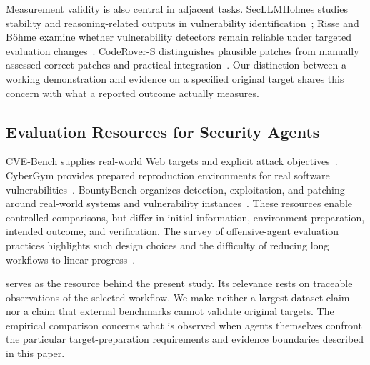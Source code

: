 Measurement validity is also central in adjacent tasks. SecLLMHolmes
studies stability and reasoning-related outputs in vulnerability
identification~\cite{ullah2024secllmholmes}; Risse and B\"ohme examine
whether vulnerability detectors remain reliable under targeted
evaluation changes~\cite{risse2024limits}. CodeRover-S distinguishes
plausible patches from manually assessed correct patches and practical
integration~\cite{zhang2026ossfuzzrepair}. Our distinction between a
working demonstration and evidence on a specified original target shares
this concern with what a reported outcome actually measures.

\subsection{Evaluation Resources for Security Agents}

CVE-Bench supplies real-world Web targets and explicit attack
objectives~\cite{cvebench}. CyberGym provides prepared reproduction
environments for real software vulnerabilities~\cite{cybergym}.
BountyBench organizes detection, exploitation, and patching around
real-world systems and vulnerability instances~\cite{bountybench}.
These resources enable controlled comparisons, but differ in initial
information, environment preparation, intended outcome, and verification.
The survey of offensive-agent evaluation practices highlights such design
choices and the difficulty of reducing long workflows to linear
progress~\cite{happe2025offensivepractices}.

\sys{} serves as the resource behind the present study. Its relevance
rests on traceable observations of the selected workflow. We make neither
a largest-dataset claim nor a claim that external benchmarks cannot
validate original targets. The empirical comparison concerns what is
observed when agents themselves confront the particular target-preparation
requirements and evidence boundaries described in this paper.
